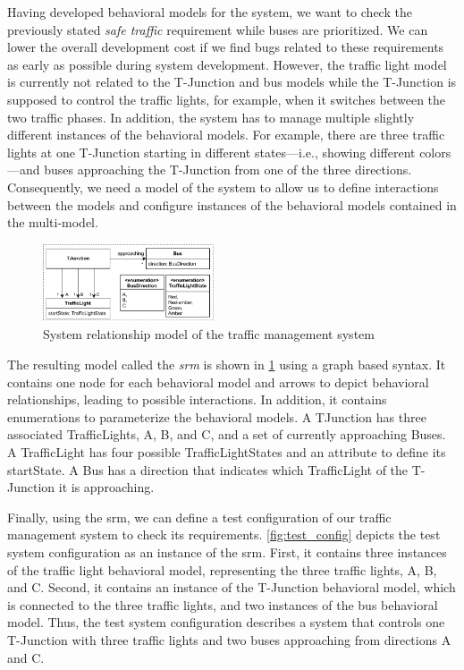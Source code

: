 \documentclass{jot}
\begin{document}
Having developed behavioral models for the system, we want to check the previously stated \emph{safe traffic} requirement while buses are prioritized.
We can lower the overall development cost if we find bugs related to these requirements as early as possible during system development.
However, the traffic light model is currently not related to the T-Junction and bus models while the T-Junction is supposed to control the traffic lights, for example, when it switches between the two traffic phases.
In addition, the system has to manage multiple slightly different instances of the behavioral models.
For example, there are three traffic lights at one T-Junction starting in different states---i.e., showing different colors---and buses approaching the T-Junction from one of the three directions.
Consequently, we need a model of the system to allow us to define interactions between the models and configure instances of the behavioral models contained in the multi-model.

\begin{figure}[h]
    \centering
    \includegraphics[width=0.45\textwidth]{figures/systemRelationShipModel.pdf}
    \caption{System relationship model of the traffic management system}
    \label{fig:systemRelationshipModel}
\end{figure}

The resulting model called the \textit{\gls*{srm}} is shown in \cref{fig:systemRelationshipModel} using a graph based syntax.
It contains one node for each behavioral model and arrows to depict behavioral relationships, leading to possible interactions.
In addition, it contains enumerations to parameterize the behavioral models. 
A \textsf{TJunction} has three associated \textsf{TrafficLight}s, \textsf{A}, \textsf{B}, and \textsf{C}, and a set of currently approaching \textsf{Bus}es.
A \textsf{TrafficLight} has four possible \textsf{TrafficLightState}s and an attribute to define its \textsf{startState}.
A \textsf{Bus} has a \textsf{direction} that indicates which \textsf{TrafficLight} of the T-Junction it is approaching.

Finally, using the \gls*{srm}, we can define a test configuration of our traffic management system to check its requirements.
\autoref{fig:test_config} depicts the test system configuration as an instance of the \gls*{srm}.
First, it contains three instances of the traffic light behavioral model, representing the three traffic lights, \textsf{A}, \textsf{B}, and \textsf{C}.
Second, it contains an instance of the T-Junction behavioral model, which is connected to the three traffic lights, and two instances of the bus behavioral model.
Thus, the test system configuration describes a system that controls one T-Junction with three traffic lights and two buses approaching from directions A and C.
\end{document}
